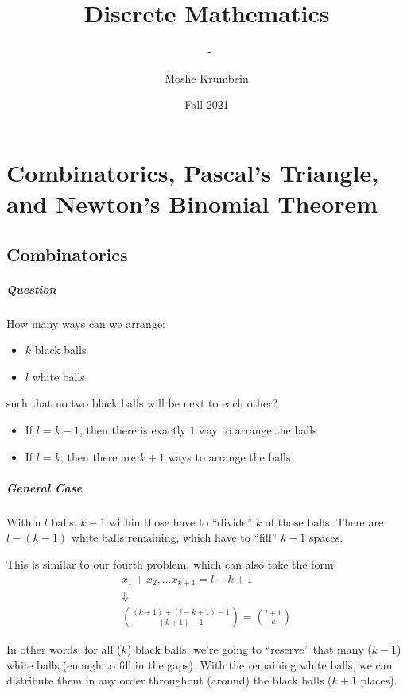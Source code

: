 \documentclass[00_complete]{subfiles}
\title{Discrete Mathematics}
\author{Moshe Krumbein}
\date{Fall 2021}
\begin{document}
\setcounter{chapter}{5}

\chapter{Combinatorics, Pascal's Triangle, and Newton's Binomial Theorem}
\subtitle{\theauthor~- \thedate}

\section{Combinatorics}

\paragraph{Question}

How many ways can we arrange:

\begin{itemize}
\item $k$ black balls
\item $l$ white balls
\end{itemize}

such that no two black balls will be next to each other?

\begin{itemize}
 \item If $l=k-1$, then there is exactly $1$ way to arrange the balls
 \item If $l = k$, then there are $k+1$ ways to arrange the balls
\end{itemize}

\paragraph{General Case}

Within $l$ balls, $k-1$ within those have to ``divide'' $k$ of those balls. There
are $l-(k-1)$ white balls remaining, which have to ``fill'' $k+1$ spaces.

This is similar to our fourth problem, which can also take the form:
$$
\begin{gathered}
    x_1+x_2, \dots x_{k+1} = l-k+1 \\
    \Downarrow \\
    \binom{(k+1)+(l-k+1)-1}{(k+1)-1} = \binom{l+1}{k}
\end{gathered}
$$

In other words, for all ($k$) black balls, we're going to ``reserve'' that many
($k-1$) white balls (enough to fill in the gaps). With the remaining white balls, we can
distribute them in any order throughout (around) the black balls ($k+1$
places).
\end{document}
